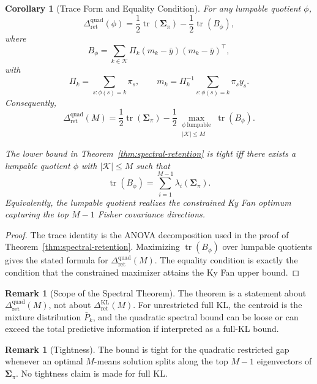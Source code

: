 \documentclass[12pt]{article}
\newtheorem{corollary}[theorem]{Corollary}
\theoremstyle{definition}
\newtheorem{remark}[theorem]{Remark}
\DeclareMathOperator{\tr}{tr}
\newcommand{\RetKL}{\Delta_{\mathrm{ret}}^{\mathrm{KL}}}
\newcommand{\RetQuad}{\Delta_{\mathrm{ret}}^{\mathrm{quad}}}
\begin{document}
\begin{corollary}[Trace Form and Equality Condition]
\label{cor:quad-trace-equality}
For any lumpable quotient $\phi$,
\[
\RetQuad(\phi)
=
\frac12\tr(\bm{\Sigma}_\pi)
-
\frac12\tr(B_\phi),
\]
where
\[
B_\phi
=
\sum_{k\in\mathcal K}
\Pi_k
(m_k-\bar y)(m_k-\bar y)^\top,
\]
with
\[
\Pi_k=\sum_{s:\phi(s)=k}\pi_s,
\qquad
m_k=\Pi_k^{-1}\sum_{s:\phi(s)=k}\pi_s y_s.
\]
Consequently,
\[
\RetQuad(M)
=
\frac12\tr(\bm{\Sigma}_\pi)
-
\frac12
\max_{\substack{
\phi\ \text{lumpable}\\
|\mathcal K|\le M
}}
\tr(B_\phi).
\]

The lower bound in Theorem~\ref{thm:spectral-retention} is tight iff there
exists a lumpable quotient $\phi$ with $|\mathcal K|\le M$ such that
\[
\tr(B_\phi)
=
\sum_{i=1}^{M-1}
\lambda_i(\bm{\Sigma}_\pi).
\]
Equivalently, the lumpable quotient realizes the constrained Ky Fan optimum
capturing the top $M-1$ Fisher covariance directions.
\end{corollary}

\begin{proof}
The trace identity is the ANOVA decomposition used in the proof of
Theorem~\ref{thm:spectral-retention}.  Maximizing $\tr(B_\phi)$ over lumpable
quotients gives the stated formula for $\RetQuad(M)$.  The equality condition
is exactly the condition that the constrained maximizer attains the Ky Fan
upper bound.
\end{proof}


\begin{remark}[Scope of the Spectral Theorem]
\label{rem:spectral-not-full-kl}
The theorem is a statement about $\RetQuad(M)$, not about $\RetKL(M)$.  For
unrestricted full KL, the centroid is the mixture distribution $\bar P_k$, and
the quadratic spectral bound can be loose or can exceed the total predictive
information if interpreted as a full-KL bound.
\end{remark}

\begin{remark}[Tightness]
\label{rem:quad-tightness}
The bound is tight for the quadratic restricted gap whenever an optimal
$M$-means solution splits along the top $M-1$ eigenvectors of
$\bm{\Sigma}_\pi$.  No tightness claim is made for full KL.
\end{remark}
\end{document}
